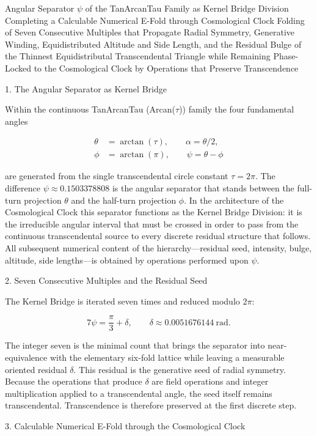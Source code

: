 Angular Separator \(\psi\) of the TanArcanTau Family as Kernel Bridge Division  
Completing a Calculable Numerical E-Fold through Cosmological Clock Folding of Seven Consecutive Multiples that Propagate Radial Symmetry, Generative Winding, Equidistributed Altitude and Side Length, and the Residual Bulge of the Thinnest Equidistributal Transcendental Triangle while Remaining Phase-Locked to the Cosmological Clock by Operations that Preserve Transcendence

1. The Angular Separator as Kernel Bridge

Within the continuous TanArcanTau (Arcan(\(\tau\))) family the four fundamental angles

\[
\begin{align*}
\theta&=\arctan(\tau),\qquad
\alpha=\theta/2,\\
\phi&=\arctan(\pi),\qquad
\psi=\theta-\phi
\end{align*}
\]

are generated from the single transcendental circle constant \(\tau=2\pi\). The difference \(\psi\approx0.1503378808\) is the angular separator that stands between the full-turn projection \(\theta\) and the half-turn projection \(\phi\). In the architecture of the Cosmological Clock this separator functions as the Kernel Bridge Division: it is the irreducible angular interval that must be crossed in order to pass from the continuous transcendental source to every discrete residual structure that follows. All subsequent numerical content of the hierarchy—residual seed, intensity, bulge, altitude, side lengths—is obtained by operations performed upon \(\psi\).

2. Seven Consecutive Multiples and the Residual Seed

The Kernel Bridge is iterated seven times and reduced modulo \(2\pi\):

\[
7\psi=\frac{\pi}{3}+\delta,\qquad\delta\approx0.0051676144\ \mathrm{rad}.
\]

The integer seven is the minimal count that brings the separator into near-equivalence with the elementary six-fold lattice while leaving a measurable oriented residual \(\delta\). This residual is the generative seed of radial symmetry. Because the operations that produce \(\delta\) are field operations and integer multiplication applied to a transcendental angle, the seed itself remains transcendental. Transcendence is therefore preserved at the first discrete step.

3. Calculable Numerical E-Fold through the Cosmological Clock

